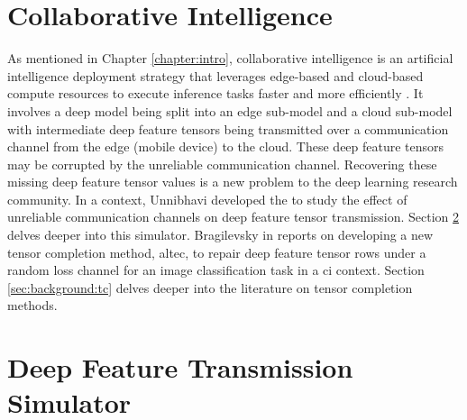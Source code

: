 \section{Collaborative Intelligence} \label{sec:background:ci}

As mentioned in Chapter \ref{chapter:intro}, collaborative intelligence is an artificial intelligence deployment strategy that leverages edge-based and cloud-based compute resources to execute inference tasks faster and more efficiently \cite{jointdnn} \cite{neurosurgeon}. It involves a deep model being split into an edge sub-model and a cloud sub-model with intermediate deep feature tensors being transmitted over a communication channel from the edge (mobile device) to the cloud. These deep feature tensors may be corrupted by the unreliable communication channel. Recovering these missing deep feature tensor values is a new problem to the deep learning research community. In a  context, Unnibhavi \cite{unnibhavi2018dfts} developed the  to study the effect of unreliable communication channels on deep feature tensor transmission. Section \ref{sec:background:dfts} delves deeper into this simulator. Bragilevsky in \cite{9017944} reports on developing a new tensor completion method, \gls{altec}, to repair deep feature tensor rows under a random loss channel for an image classification task in a \gls{ci} context. Section \ref{sec:background:tc} delves deeper into the literature on tensor completion methods.

\section{Deep Feature Transmission Simulator} \label{sec:background:dfts}

